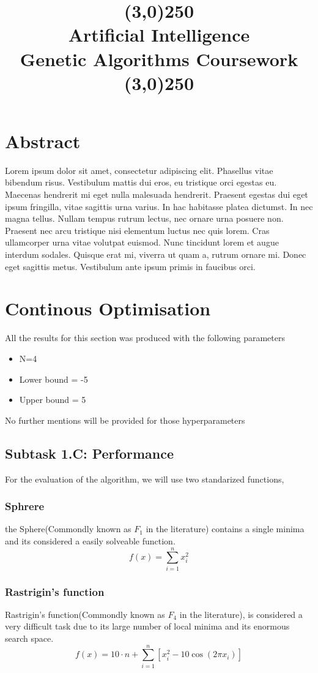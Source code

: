 \documentclass[openany]{article}
\title{\line(3,0){250}\\Artificial Intelligence \\ Genetic Algorithms Coursework  \\\line(3,0){250}}
\begin{document}
	\maketitle
	\pagebreak
	\section{Abstract}
		Lorem ipsum dolor sit amet, consectetur adipiscing elit. Phasellus vitae bibendum risus. Vestibulum mattis dui eros, 
		eu tristique orci egestas eu. Maecenas hendrerit mi eget nulla malesuada hendrerit. Praesent egestas dui eget ipsum fringilla, 
		vitae sagittis urna varius. In hac habitasse platea dictumst. In nec magna tellus. Nullam tempus rutrum lectus, nec ornare urna 
		posuere non. Praesent nec arcu tristique nisi elementum luctus nec quis lorem. Cras ullamcorper urna vitae volutpat euismod. Nunc 
		tincidunt lorem et augue interdum sodales. Quisque erat mi, viverra ut quam a, rutrum ornare mi. Donec eget sagittis metus. 
		Vestibulum ante ipsum primis in faucibus orci. 
	\pagebreak
	\section{Continous Optimisation}
		\begin{note}
			All the results for this section was produced with the following parameters
			\begin{itemize}
				\item N=4
				\item Lower bound = -5
				\item Upper bound = 5
			\end{itemize}
			No further mentions will be provided for those hyperparameters
		\end{note}
		\subsection{Subtask 1.C: Performance}
			For the evaluation of the algorithm, we will use two standarized functions, 
			\subsubsection{Sphrere}
				the Sphere(Commondly known as $F_{1}$ in the literature\cite{performance}) contains a single minima and its considered a easily solveable function.
				\begin{equation}
				f(x)=\sum_{i=1}^{n}{x_{i}^2}
				\end{equation}
			\subsubsection{Rastrigin's function}
				Rastrigin’s function(Commondly known as $F_{4}$ in the literature\cite{performance}), is considered a very difficult task due to its large number of local minima and its enormous search space.
				\begin{equation}
				f(x)=10\cdot n+\sum_{i=1}^{n}[x_{i}^{2}-10\cos(2\pi x_{i})]
				\end{equation}
\end{document}
